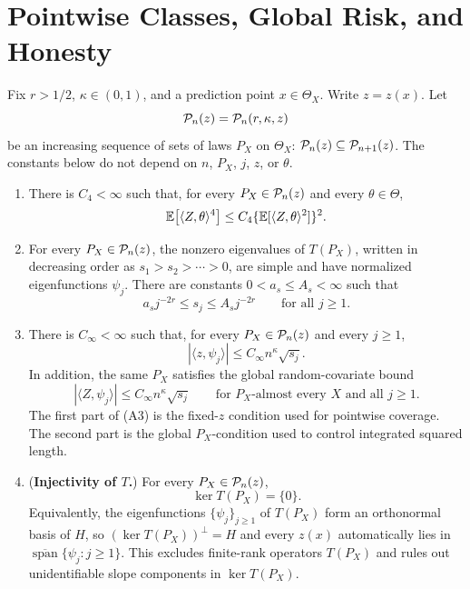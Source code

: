 \documentclass{article}
\begin{document}
\section{Pointwise Classes, Global Risk, and Honesty}

Fix \(r>1/2\), \(\kappa\in(0,1)\), and a prediction point
\(x\in\Theta_X\). Write \(z=z(x)\). Let
\[
  \mathcal P_n(z)=\mathcal P_n(r,\kappa,z)
\]
be an increasing sequence of sets of laws \(P_X\) on \(\Theta_X\):
\(\mathcal P_n(z)\subseteq\mathcal P_{n+1}(z)\). The constants below do not depend on
\(n\), \(P_X\), \(j\), \(z\), or \(\theta\).

\begin{enumerate}
  \item[(A1)] There is \(C_4<\infty\) such that, for every
  \(P_X\in\mathcal P_n(z)\) and every \(\theta\in\Theta\),
  \[
    \mathbb{E}\big[\langle Z,\theta\rangle^4\big]
    \le
    C_4\{\mathbb{E}[\langle Z,\theta\rangle^2]\}^2 .
  \]

  \item[(A2)] For every \(P_X\in\mathcal P_n(z)\), the nonzero eigenvalues of
  \(T(P_X)\), written in decreasing order as
  \(s_1>s_2>\cdots>0\), are simple and have normalized eigenfunctions
  \(\psi_j\). There are constants \(0<a_s\le A_s<\infty\) such that
  \[
    a_s j^{-2r}\le s_j\le A_s j^{-2r}
    \qquad\text{for all }j\ge 1.
  \]

  \item[(A3)] There is \(C_\infty<\infty\) such that, for every
  \(P_X\in\mathcal P_n(z)\) and every \(j\ge 1\),
  \[
    |\langle z,\psi_j\rangle|
    \le C_\infty n^\kappa\sqrt{s_j}.
  \]
  In addition, the same \(P_X\) satisfies the global random-covariate bound
  \[
    |\langle Z,\psi_j\rangle|
    \le C_\infty n^\kappa\sqrt{s_j}
    \qquad\text{for \(P_X\)-almost every \(X\) and all }j\ge 1.
  \]
  The first part of (A3) is the fixed-\(z\) condition used for pointwise
  coverage. The second part is the global \(P_X\)-condition used to control
  integrated squared length.

  \item[(A4)] (\textbf{Injectivity of \(T\).}) For every
  \(P_X\in\mathcal P_n(z)\),
  \[
    \ker T(P_X)=\{0\}.
  \]
  Equivalently, the eigenfunctions \(\{\psi_j\}_{j\ge1}\) of \(T(P_X)\)
  form an orthonormal basis of \(H\), so \((\ker T(P_X))^{\perp}=H\)
  and every \(z(x)\) automatically lies in
  \(\overline{\operatorname{span}}\{\psi_j:j\ge1\}\). This excludes
  finite-rank operators \(T(P_X)\) and rules out unidentifiable slope
  components in \(\ker T(P_X)\).
\end{enumerate}
\end{document}
